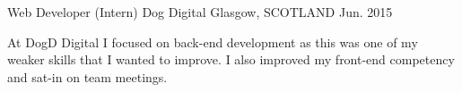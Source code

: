 \begin{cventries}
  \cventry
    {Web Developer (Intern)} %
    {Dog Digital} %
    {Glasgow, SCOTLAND} %
    {Jun. 2015} %
    {
      \begin{cvitems} %
        \item At DogD Digital I focused on back-end development as this was one of my weaker skills that I wanted to improve. I also improved my front-end competency and sat-in on team meetings.
      \end{cvitems}
    }
\end{cventries}
\vspace{-0.3cm}
